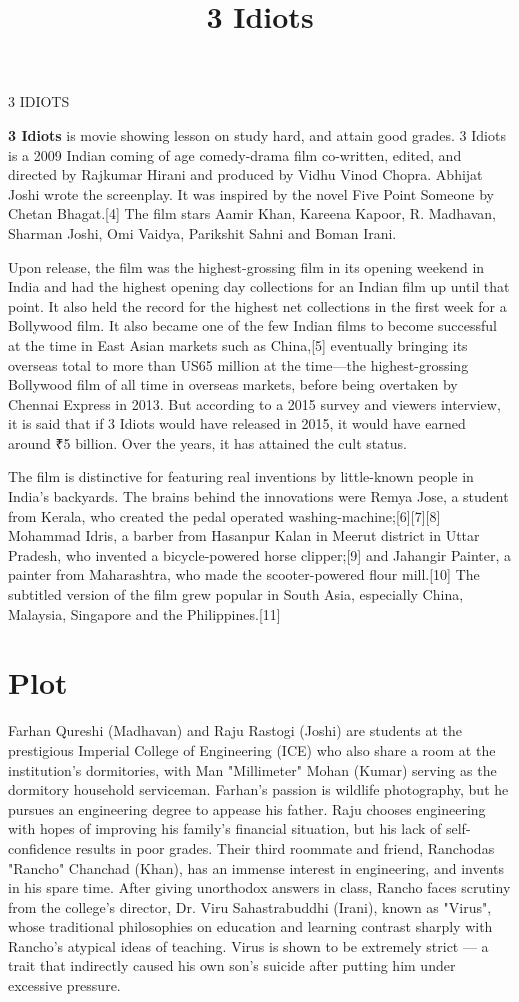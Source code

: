 \documentclass{article}
\title{3 Idiots}
\begin{document}
\begin{center} \LARGE 3 IDIOTS
\end{center}
\Large{
\begin{center}\textbf{3 Idiots} is movie showing lesson on study hard, and attain good grades. 3 Idiots is a 2009 Indian coming of age comedy-drama film co-written, edited, and directed by Rajkumar Hirani and produced by Vidhu Vinod Chopra. Abhijat Joshi wrote the screenplay. It was inspired by the novel Five Point Someone by Chetan Bhagat.[4] The film stars Aamir Khan, Kareena Kapoor, R. Madhavan, Sharman Joshi, Omi Vaidya, Parikshit Sahni and Boman Irani.

Upon release, the film was the highest-grossing film in its opening weekend in India and had the highest opening day collections for an Indian film up until that point. It also held the record for the highest net collections in the first week for a Bollywood film. It also became one of the few Indian films to become successful at the time in East Asian markets such as China,[5] eventually bringing its overseas total to more than US65 million at the time—the highest-grossing Bollywood film of all time in overseas markets, before being overtaken by Chennai Express in 2013. But according to a 2015 survey and viewers interview, it is said that if 3 Idiots would have released in 2015, it would have earned around ₹5 billion. Over the years, it has attained the cult status.

The film is distinctive for featuring real inventions by little-known people in India's backyards. The brains behind the innovations were Remya Jose, a student from Kerala, who created the pedal operated washing-machine;[6][7][8] Mohammad Idris, a barber from Hasanpur Kalan in Meerut district in Uttar Pradesh, who invented a bicycle-powered horse clipper;[9] and Jahangir Painter, a painter from Maharashtra, who made the scooter-powered flour mill.[10] The subtitled version of the film grew popular in South Asia, especially China, Malaysia, Singapore and the Philippines.[11] \end{center}}
\section{Plot}
Farhan Qureshi (Madhavan) and Raju Rastogi (Joshi) are students at the prestigious Imperial College of Engineering (ICE) who also share a room at the institution's dormitories, with Man "Millimeter" Mohan (Kumar) serving as the dormitory household serviceman. Farhan's passion is wildlife photography, but he pursues an engineering degree to appease his father. Raju chooses engineering with hopes of improving his family's financial situation, but his lack of self-confidence results in poor grades. Their third roommate and friend, Ranchodas "Rancho" Chanchad (Khan), has an immense interest in engineering, and invents in his spare time. After giving unorthodox answers in class, Rancho faces scrutiny from the college's director, Dr. Viru Sahastrabuddhi (Irani), known as "Virus", whose traditional philosophies on education and learning contrast sharply with Rancho's atypical ideas of teaching. Virus is shown to be extremely strict — a trait that indirectly caused his own son's suicide after putting him under excessive pressure.
\end{document}
